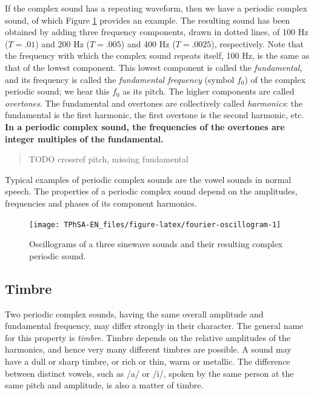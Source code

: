 \documentclass[
]{book}
\begin{document}
If the complex sound has a repeating waveform, then we have a periodic complex sound, of which Figure \ref{fig:fourier-oscillogram} provides an example. The resulting sound has been obtained by adding three frequency components, drawn in dotted lines, of 100 Hz (\(T=.01\)) and 200 Hz (\(T=.005\)) and 400 Hz (\(T=.0025\)), respectively. Note that the frequency with which the complex sound repeats itself, 100 Hz, is the same as that of the lowest component. This lowest component is called the \emph{fundamental}, and its frequency is called the \emph{fundamental frequency} (symbol \(f_0\)) of the complex periodic sound; we hear this \(f_0\) as its pitch. The higher components are called \emph{overtones}. The fundamental and overtones are collectively called \emph{harmonics}: the fundamental is the first harmonic, the first overtone is the second harmonic, etc.
\textbf{In a periodic complex sound, the frequencies of the overtones are integer multiples of the fundamental.}

\begin{quote}
TODO crossref pitch, missing fundamental
\end{quote}

Typical examples of periodic complex sounds are the vowel sounds in normal speech. The properties of a periodic complex sound depend on the amplitudes, frequencies and phases of its component harmonics.

\begin{figure}

{\centering \texttt{[image: TPhSA-EN\_files/figure-latex/fourier-oscillogram-1]} 

}

\caption{Oscillograms of a three sinewave sounds and their resulting complex periodic sound.}\label{fig:fourier-oscillogram}
\end{figure}

\subsection{Timbre}\label{timbre}

Two periodic complex sounds, having the same overall amplitude and fundamental frequency, may differ strongly in their character. The general name for this property is \emph{timbre}.
Timbre depends on the relative amplitudes of the harmonics, and hence very many different timbres are possible. A sound may have a dull or sharp timbre, or rich or thin, warm or metallic. The difference between distinct vowels, such as /a/ or /i/, spoken by the same person at the same pitch and amplitude, is also a matter of timbre.
\end{document}
